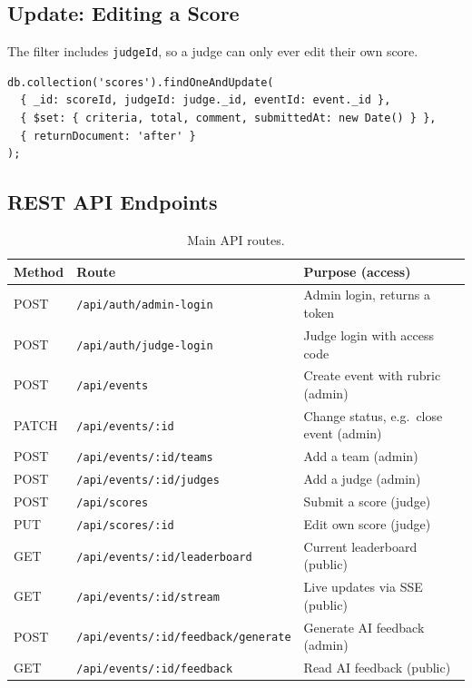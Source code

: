 \documentclass[11pt,a4paper]{article}
\begin{document}
\subsection{Update: Editing a Score}
The filter includes \texttt{judgeId}, so a judge can only ever edit their own score.
\begin{lstlisting}
db.collection('scores').findOneAndUpdate(
  { _id: scoreId, judgeId: judge._id, eventId: event._id },
  { $set: { criteria, total, comment, submittedAt: new Date() } },
  { returnDocument: 'after' }
);
\end{lstlisting}

\subsection{REST API Endpoints}
\begin{table}[H]
\centering
\small
\begin{tabularx}{\textwidth}{l l X}
\toprule
\textbf{Method} & \textbf{Route} & \textbf{Purpose (access)} \\
\midrule
POST   & \texttt{/api/auth/admin-login}            & Admin login, returns a token \\
POST   & \texttt{/api/auth/judge-login}            & Judge login with access code \\
POST   & \texttt{/api/events}                      & Create event with rubric (admin) \\
PATCH  & \texttt{/api/events/:id}                  & Change status, e.g.\ close event (admin) \\
POST   & \texttt{/api/events/:id/teams}            & Add a team (admin) \\
POST   & \texttt{/api/events/:id/judges}           & Add a judge (admin) \\
POST   & \texttt{/api/scores}                      & Submit a score (judge) \\
PUT    & \texttt{/api/scores/:id}                  & Edit own score (judge) \\
GET    & \texttt{/api/events/:id/leaderboard}      & Current leaderboard (public) \\
GET    & \texttt{/api/events/:id/stream}           & Live updates via SSE (public) \\
POST   & \texttt{/api/events/:id/feedback/generate}& Generate AI feedback (admin) \\
GET    & \texttt{/api/events/:id/feedback}         & Read AI feedback (public) \\
\bottomrule
\end{tabularx}
\caption{Main API routes.}
\end{table}
\end{document}
